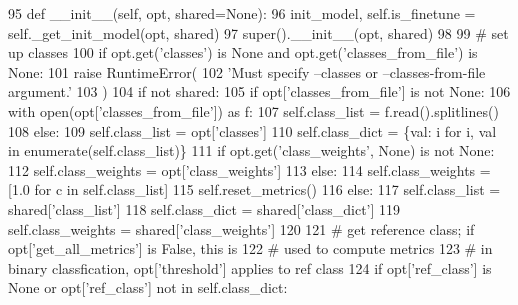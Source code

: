 \begin{DoxyCode}
95     \textcolor{keyword}{def }\_\_init\_\_(self, opt, shared=None):
96         init\_model, self.is\_finetune = self.\_get\_init\_model(opt, shared)
97         super().\_\_init\_\_(opt, shared)
98 
99         \textcolor{comment}{# set up classes}
100         \textcolor{keywordflow}{if} opt.get(\textcolor{stringliteral}{'classes'}) \textcolor{keywordflow}{is} \textcolor{keywordtype}{None} \textcolor{keywordflow}{and} opt.get(\textcolor{stringliteral}{'classes\_from\_file'}) \textcolor{keywordflow}{is} \textcolor{keywordtype}{None}:
101             \textcolor{keywordflow}{raise} RuntimeError(
102                 \textcolor{stringliteral}{'Must specify --classes or --classes-from-file argument.'}
103             )
104         \textcolor{keywordflow}{if} \textcolor{keywordflow}{not} shared:
105             \textcolor{keywordflow}{if} opt[\textcolor{stringliteral}{'classes\_from\_file'}] \textcolor{keywordflow}{is} \textcolor{keywordflow}{not} \textcolor{keywordtype}{None}:
106                 with open(opt[\textcolor{stringliteral}{'classes\_from\_file'}]) \textcolor{keyword}{as} f:
107                     self.class\_list = f.read().splitlines()
108             \textcolor{keywordflow}{else}:
109                 self.class\_list = opt[\textcolor{stringliteral}{'classes'}]
110             self.class\_dict = \{val: i \textcolor{keywordflow}{for} i, val \textcolor{keywordflow}{in} enumerate(self.class\_list)\}
111             \textcolor{keywordflow}{if} opt.get(\textcolor{stringliteral}{'class\_weights'}, \textcolor{keywordtype}{None}) \textcolor{keywordflow}{is} \textcolor{keywordflow}{not} \textcolor{keywordtype}{None}:
112                 self.class\_weights = opt[\textcolor{stringliteral}{'class\_weights'}]
113             \textcolor{keywordflow}{else}:
114                 self.class\_weights = [1.0 \textcolor{keywordflow}{for} c \textcolor{keywordflow}{in} self.class\_list]
115             self.reset\_metrics()
116         \textcolor{keywordflow}{else}:
117             self.class\_list = shared[\textcolor{stringliteral}{'class\_list'}]
118             self.class\_dict = shared[\textcolor{stringliteral}{'class\_dict'}]
119             self.class\_weights = shared[\textcolor{stringliteral}{'class\_weights'}]
120 
121         \textcolor{comment}{# get reference class; if opt['get\_all\_metrics'] is False, this is}
122         \textcolor{comment}{# used to compute metrics}
123         \textcolor{comment}{# in binary classfication, opt['threshold'] applies to ref class}
124         \textcolor{keywordflow}{if} opt[\textcolor{stringliteral}{'ref\_class'}] \textcolor{keywordflow}{is} \textcolor{keywordtype}{None} \textcolor{keywordflow}{or} opt[\textcolor{stringliteral}{'ref\_class'}] \textcolor{keywordflow}{not} \textcolor{keywordflow}{in} self.class\_dict:

\end{DoxyCode}
